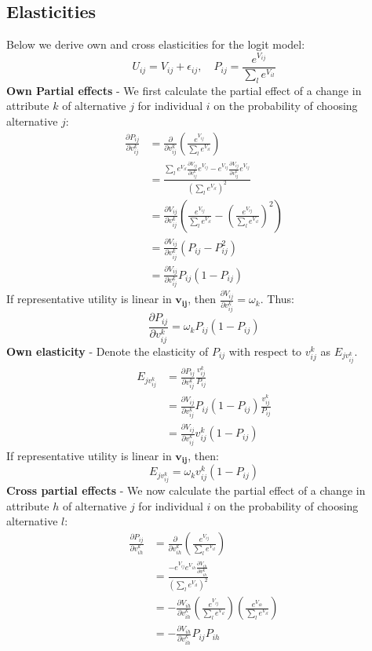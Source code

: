 \documentclass[DIV=14,titlepage=false]{scrreprt}
\begin{document}
\subsection{Elasticities}
Below we derive own and cross elasticities for the logit model: \[U_{ij} = V_{ij} + \epsilon_{ij}, \quad P_{ij} = \frac{e^{V_{ij}}}{\sum_l e^{V_{il}}}\]
\textbf{Own Partial effects} - We first calculate the partial effect of a change in attribute $k$ of alternative $j$ for individual $i$ on the probability of choosing alternative $j$:
\begin{align*}
    \frac{\partial P_{ij}}{\partial v_{ij}^k} &= \frac{\partial}{\partial v_{ij}^k} \left(\frac{e^{V_{ij}}}{\sum_l e^{V_{il}}}\right) \\
    &= \frac{\sum_l e^{V_{il}} \frac{\partial V_{ij}}{\partial v_{ij}^k} e^{V_{ij}} - e^{V_{ij}} \frac{\partial V_{ij}}{\partial v_{ij}^k} e^{V_{ij}}}{\left(\sum_l e^{V_{il}}\right)^2} \\
    &= \frac{\partial V_{ij}}{\partial v_{ij}^k} \left( \frac{e^{V_{ij}}}{\sum_l e^{V_{il}}} - \left(\frac{e^{V_{ij}}}{\sum_l e^{V_{il}}}\right)^2 \right) \\
    &= \frac{\partial V_{ij}}{\partial v_{ij}^k} (P_{ij} - P_{ij}^2)\\
    &= \frac{\partial V_{ij}}{\partial v_{ij}^k} P_{ij} (1 - P_{ij})
\end{align*}
If representative utility is linear in $\mathbf{v_{ij}}$, then $\frac{\partial V_{ij}}{\partial v_{ij}^k} = \omega_k$. Thus: 
\[
   \frac{\partial P_{ij}}{\partial v_{ij}^k} = \omega_k P_{ij} (1 - P_{ij})
\]
\textbf{Own elasticity} - Denote the elasticity of $P_{ij}$ with respect to $v_{ij}^k$ as $E_{jv_{ij}^k}$.
\begin{align*}
    E_{jv_{ij}^k} &= \frac{\partial P_{ij}}{\partial v_{ij}^k} \frac{v_{ij}^k}{P_{ij}} \\
    &= \frac{\partial V_{ij}}{\partial v_{ij}^k} P_{ij}(1 - P_{ij}) \frac{v_{ij}^k}{P_{ij}} \\
    &= \frac{\partial V_{ij}}{\partial v_{ij}^k} v_{ij}^k (1 - P_{ij}) 
\end{align*}
If representative utility is linear in $\mathbf{v_{ij}}$, then:
\[
    E_{jv_{ij}^k} = \omega_k v_{ij}^k (1 - P_{ij})
\]
\textbf{Cross partial effects} - We now calculate the partial effect of a change in attribute $h$ of alternative $j$ for individual $i$ on the probability of choosing alternative $l$:
\begin{align*}
    \frac{\partial P_{ij}}{\partial v_{ih}^k} &= \frac{\partial}{\partial v_{ih}^k} \left(\frac{e^{V_{ij}}}{\sum_l e^{V_{il}}}\right) \\
    &= \frac{- e^{V_{ij}}e^{V_{ih}} \frac{\partial V_{ih}}{\partial v_{ih}^k}}{\left(\sum_l e^{V_{il}}\right)^2} \\
    &= - \frac{\partial V_{ih}}{\partial v_{ih}^k} \left( \frac{e^{V_{ij}}}{\sum_l e^{V_{il}}} \right) \left( \frac{e^{V_{ih}}}{\sum_l e^{V_{il}}} \right) \\
    &= - \frac{\partial V_{ih}}{\partial v_{ih}^k} P_{ij} P_{ih}
\end{align*}
\end{document}
